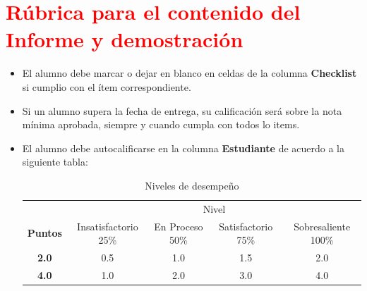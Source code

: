 \documentclass{article}
\begin{document}
	\clearpage
	
	\section{\textcolor{red}{Rúbrica para el contenido del Informe y demostración}}
	\begin{itemize}			
		\item El alumno debe marcar o dejar en blanco en celdas de la columna \textbf{Checklist} si cumplio con el ítem correspondiente.
		\item Si un alumno supera la fecha de entrega,  su calificación será sobre la nota mínima aprobada, siempre y cuando cumpla con todos lo items.
		\item El alumno debe autocalificarse en la columna \textbf{Estudiante} de acuerdo a la siguiente tabla:
	
		\begin{table}[ht]
			\caption{Niveles de desempeño}
			\begin{center}
			\begin{tabular}{ccccc}
    			\hline
    			 & \multicolumn{4}{c}{Nivel}\\
    			\cline{1-5}
    			\textbf{Puntos} & Insatisfactorio 25\%& En Proceso 50\% & Satisfactorio 75\% & Sobresaliente 100\%\\
    			\textbf{2.0}&0.5&1.0&1.5&2.0\\
    			\textbf{4.0}&1.0&2.0&3.0&4.0\\
    		\hline
			\end{tabular}
		\end{center}
	\end{table}	
	
	\end{itemize}
	
\end{document}
